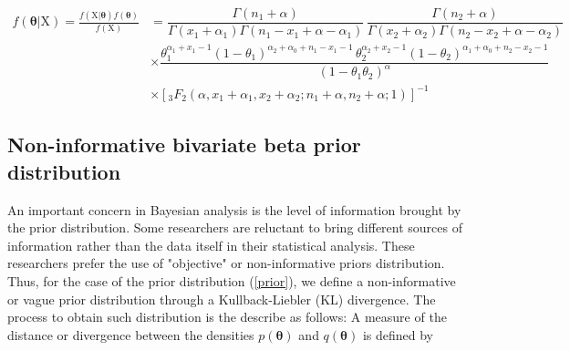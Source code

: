 \documentclass[AMA,Times1COL]{WileyNJDv5} %
\newcommand{\bX}{\boldsymbol{\mathrm{X}}}
\newcommand{\bth}{\boldsymbol{\theta}}
\begin{document}



\begin{align}\label{posti}
f(\boldsymbol{\theta} \vert \bX)=\frac{f(\bX\vert \boldsymbol{\theta})f(\boldsymbol{\theta})}{f(\bX)}&=
\dfrac{\Gamma(n_1+\alpha)}{\Gamma(x_{1}+\alpha_1)\Gamma(n_1-x_{1}+\alpha-\alpha_1)} \, \dfrac{\Gamma(n_2+\alpha)}{\Gamma(x_{2}+\alpha_2)\Gamma(n_2-x_{2}+\alpha-\alpha_2)} \nonumber\\[3.5pt]
&\times \dfrac{\theta_1^{\alpha_1+x_{1}-1} (1-\theta_1)^{\alpha_2+\alpha_0+n_1-x_{1}-1} \, \theta_2^{\alpha_2+x_{2}-1} (1-\theta_2)^{\alpha_1+\alpha_0+n_2-x_{2}-1}}{(1-\theta_1\theta_2)^{\alpha}}\nonumber\\[3pt]
&\times  \left[{}_3 F_2(\alpha,x_{1}+\alpha_1, x_{2}+\alpha_2; n_1+\alpha, n_2+\alpha;1)\right]^{-1}
\end{align}





\subsection{Non-informative bivariate beta prior distribution}\label{secKL}

An important concern in Bayesian analysis is the level of information brought by the prior distribution. Some researchers are reluctant to bring different sources of information rather than the data itself in their statistical analysis. These researchers prefer the use of "objective" or non-informative priors distribution. Thus, for the case of the prior distribution (\ref{prior}), we define a non-informative or vague prior distribution through a Kullback-Liebler (KL) divergence. The process to obtain such distribution is the describe as follows:\newline
A measure of the distance or divergence between the densities $p(\boldsymbol{\theta})$ and $q(\boldsymbol{\theta})$ is defined by
\end{document}
